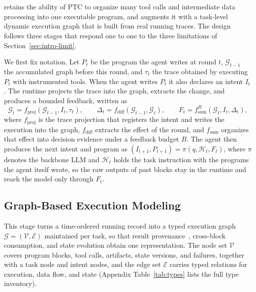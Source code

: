 \section{\method}
\label{sec:method}

\method retains the ability of PTC to organize many tool calls and intermediate data processing into one executable program, and augments it with a task-level dynamic execution graph that is built from real running traces.
The design follows three stages that respond one to one to the three limitations of Section~\ref{sec:intro-limit}.

We first fix notation.
Let $P_t$ be the program the agent writes at round $t$, $\mathcal{G}_{t-1}$ the accumulated graph before this round, and $\tau_t$ the trace obtained by executing $P_t$ with instrumented tools.
When the agent writes $P_t$ it also declares an intent $I_t$.
The runtime projects the trace into the graph, extracts the change, and produces a bounded feedback, written as
\begin{equation}
\mathcal{G}_t = f_{\mathrm{proj}}(\mathcal{G}_{t-1}, I_t, \tau_t), \qquad
\Delta_t = f_{\mathrm{diff}}(\mathcal{G}_{t-1}, \mathcal{G}_t), \qquad
F_t = f_{\mathrm{sum}}^{B}(\mathcal{G}_t, I_t, \Delta_t),
\label{eq:pipeline}
\end{equation}
where $f_{\mathrm{proj}}$ is the trace projection that registers the intent and writes the execution into the graph, $f_{\mathrm{diff}}$ extracts the effect of the round, and $f_{\mathrm{sum}}$ organizes that effect into decision evidence under a feedback budget $B$.
The agent then produces the next intent and program as $(I_{t+1}, P_{t+1}) = \pi(q, \mathcal{H}_t, F_t)$, where $\pi$ denotes the backbone LLM and $\mathcal{H}_t$ holds the task instruction with the programs the agent itself wrote, so the raw outputs of past blocks stay in the runtime and reach the model only through $F_t$.

\subsection{Graph-Based Execution Modeling}
\label{sec:method-modeling}

This stage turns a time-ordered running record into a typed execution graph $\mathcal{G}=(\mathcal{V},\mathcal{E})$ maintained per task, so that result provenance~\citep{herschel2017provenance}, cross-block consumption, and state evolution obtain one representation.
The node set $\mathcal{V}$ covers program blocks, tool calls, artifacts, state versions, and failures, together with a task node and intent nodes, and the edge set $\mathcal{E}$ carries typed relations for execution, data flow, and state (Appendix Table~\ref{tab:types} lists the full type inventory).


